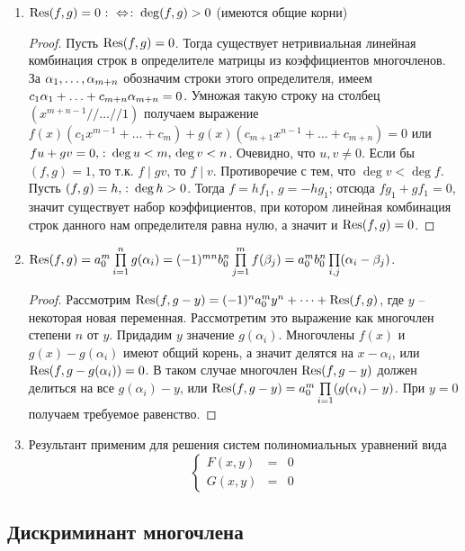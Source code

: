 \begin{enumerate}
  \item $\operatorname{Res}(f,g)=0 \mathbin{\colon\Leftrightarrow\colon} \deg(f,g)>0$ (имеются общие корни)
    \begin{proof}
      Пусть $\operatorname{Res}(f,g)=0$. Тогда существует нетривиальная линейная комбинация строк в определителе матрицы из коэффициентов многочленов. За $\alpha_1,\dots,\alpha_{m+n}$ обозначим строки этого определителя, имеем $c_1\al_1\bw+\dots\bw+c_{m+n}\al_{m+n}=0$. Умножая такую строку на столбец $(x^{m+n-1} // \dots // 1)$ получаем выражение $f(x)(c_1x^{m-1}+\dots+c_m)+g(x)(c_{m+1}x^{n-1}+\dots+c_{m+n})=0$ или $fu+gv=0,\colon\deg u<m,\,\deg v<n$. Очевидно, что $u,v\ne0$. Если бы $(f,g)=1$, то т.к. $f\mid gv$, то $f\mid v$. Противоречие с тем, что $\deg v<\deg f$.\\
      
      Пусть $(f,g)=h,\colon \deg h>0$. Тогда $f=hf_1$, $g=-hg_1$; отсюда $fg_1+gf_1=0$, значит существует набор коэффициентов, при котором линейная комбинация строк данного нам определителя равна нулю, а значит и $\operatorname{Res}(f,g)=0$.
    \end{proof}
  \item $\operatorname{Res}(f,g)=a_0^m\prod\limits_{i=1}^n g(\alpha_i)=(-1)^{mn}b_0^n\prod\limits_{j=1}^m f(\beta_j)=a_0^mb_0^n\prod\limits_{i,j}(\alpha_i-\beta_j)$.
    \begin{proof}
      Рассмотрим $\operatorname{Res}(f,g-y)=(-1)^na_0^my^n+\dots+\operatorname{Res}(f,g)$, где $y$ -- некоторая новая переменная. Рассмотретим это выражение как многочлен степени $n$ от $y$. Придадим $y$ значение $g(\alpha_i)$. Многочлены $f(x)$ и $g(x)-g(\alpha_i)$ имеют общий корень, а значит делятся на $x-\alpha_i$, или $\operatorname{Res}(f,g-g(\alpha_i))=0$. В таком случае многочлен $\operatorname{Res}(f,g-y)$ должен делиться на все $g(\alpha_i)-y$, или $\operatorname{Res}(f,g-y)=a_0^m\prod\limits_{i=1}(g(\alpha_i)-y)$. При $y=0$ получаем требуемое равенство.
    \end{proof}
  \item Результант применим для решения систем полиномиальных уравнений вида
    $$
      \left\{\begin{array}{lcl}
        F(x,y) &=& 0\\
        G(x,y) &=& 0
      \end{array}\right.
    $$
\end{enumerate}

\subsection{Дискриминант многочлена}

